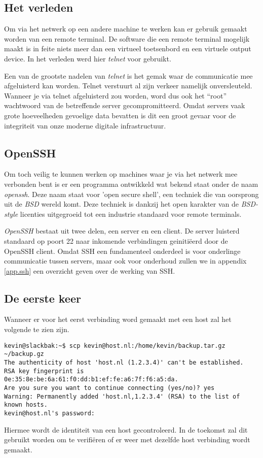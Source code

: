 \subsection{Het verleden}
Om via het netwerk op een andere machine te werken kan er gebruik gemaakt worden van een remote terminal. De software die een remote terminal mogelijk maakt is in feite niets meer dan een virtueel toetsenbord en een virtuele output device. In het verleden werd hier \emph{telnet} voor gebruikt. 

Een van de grootste nadelen van \emph{telnet} is het gemak waar de communicatie mee afgeluisterd kan worden. Telnet verstuurt al zijn verkeer namelijk onversleuteld. Wanneer je via telnet afgeluisterd zou worden, word dus ook het ``root'' wachtwoord van de betreffende server gecompromitteerd. Omdat servers vaak grote hoeveelheden gevoelige data bevatten is dit een groot gevaar voor de integriteit van onze moderne digitale infrastructuur. 

\subsection{OpenSSH}
Om toch veilig te kunnen werken op machines waar je via het netwerk mee verbonden bent is er een programma ontwikkeld wat bekend staat onder de naam \emph{openssh}. Deze naam staat voor 'open secure shell', een techniek die van oorsprong uit de \emph{BSD} wereld komt. Deze techniek is dankzij het open karakter van de \emph{BSD-style} licenties uitgegroeid tot een industrie standaard voor remote terminals. 

\emph{OpenSSH} bestaat uit twee delen, een server en een client. De server luisterd standaard op poort 22 naar inkomende verbindingen geiniti\"{e}erd door de OpenSSH client. Omdat SSH een fundamenteel onderdeel is voor onderlinge communicatie tussen servers, maar ook voor onderhoud zullen we in appendix \ref{app.ssh} een overzicht geven over de werking van SSH. 

\subsection{De eerste keer}
Wanneer er voor het eerst verbinding word gemaakt met een host zal het volgende te zien zijn.
\begin{lstlisting}
kevin@slackbak:~$ scp kevin@host.nl:/home/kevin/backup.tar.gz ~/backup.gz
The authenticity of host 'host.nl (1.2.3.4)' can't be established.
RSA key fingerprint is 0e:35:8e:be:6a:61:f0:dd:b1:ef:fe:a6:7f:f6:a5:da.
Are you sure you want to continue connecting (yes/no)? yes
Warning: Permanently added 'host.nl,1.2.3.4' (RSA) to the list of known hosts.
kevin@host.nl's password:
\end{lstlisting}%
Hiermee wordt de identiteit van een host gecontroleerd. In de toekomst zal dit gebruikt worden om te verifi\"{e}ren of er weer met dezelfde host verbinding wordt gemaakt. 

